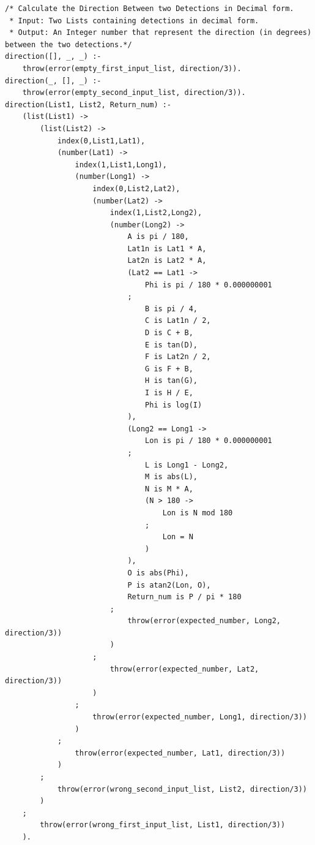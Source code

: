 \documentclass{article}
\begin{document}
\begin{lstlisting}
/* Calculate the Direction Between two Detections in Decimal form.
 * Input: Two Lists containing detections in decimal form.
 * Output: An Integer number that represent the direction (in degrees) between the two detections.*/
direction([], _, _) :-
    throw(error(empty_first_input_list, direction/3)).
direction(_, [], _) :-
    throw(error(empty_second_input_list, direction/3)).
direction(List1, List2, Return_num) :-
    (list(List1) -> 
        (list(List2) -> 
            index(0,List1,Lat1),
            (number(Lat1) -> 
                index(1,List1,Long1),
                (number(Long1) -> 
                    index(0,List2,Lat2),
                    (number(Lat2) -> 
                        index(1,List2,Long2),
                        (number(Long2) -> 
                            A is pi / 180,
                            Lat1n is Lat1 * A,
                            Lat2n is Lat2 * A,
                            (Lat2 == Lat1 -> 
                                Phi is pi / 180 * 0.000000001
                            ;
                                B is pi / 4,
                                C is Lat1n / 2,
                                D is C + B,
                                E is tan(D),
                                F is Lat2n / 2,
                                G is F + B,
                                H is tan(G),
                                I is H / E,
                                Phi is log(I)
                            ),
                            (Long2 == Long1 ->
                                Lon is pi / 180 * 0.000000001
                            ;
                                L is Long1 - Long2,
                                M is abs(L), 
                                N is M * A,
                                (N > 180 -> 
                                    Lon is N mod 180
                                ;
                                    Lon = N
                                )
                            ),
                            O is abs(Phi),
                            P is atan2(Lon, O),
                            Return_num is P / pi * 180
                        ;
                            throw(error(expected_number, Long2, direction/3))
                        )
                    ;
                        throw(error(expected_number, Lat2, direction/3))
                    )
                ;
                    throw(error(expected_number, Long1, direction/3))
                )
            ;
                throw(error(expected_number, Lat1, direction/3))
            )
        ;
            throw(error(wrong_second_input_list, List2, direction/3))
        )
    ;
        throw(error(wrong_first_input_list, List1, direction/3))
    ).
    

\end{lstlisting}
\end{document}
